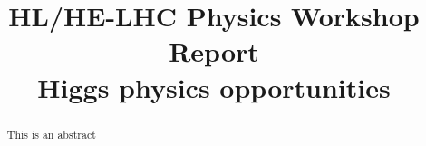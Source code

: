 \documentclass[11pt,twoside,a4paper]{cernrep}
\def\bibfiles{\main/bib/chapter,\main/section1/bib/section,\main/section2/bib/section,\main/section3/bib/section,\main/section4/bib/section,\main/section5/bib/section,\main/section6/bib/section,\main/section7/bib/section,\main/section8/bib/section,\main/section9/bib/section}
\providecommand{\biblio}{\nocite{article-minimal}\clearpage}  %
\begin{document}

\def\lra#1{\overset{\text{\scriptsize$\leftrightarrow$}}{#1}}

\def\biblio{}

\title{HL/HE-LHC Physics Workshop Report \\[5mm]
  Higgs physics opportunities}

% 
%
% 

\maketitle
% 
%
% 
\begin{abstract}
This is an abstract 
\end{abstract}

\setcounter{tocdepth}{3}
\tableofcontents
\newpage


\newpage

\newpage

\newpage
%
\newpage

\newpage

\newpage

\newpage

\newpage

\newpage

\newpage





\end{document}
